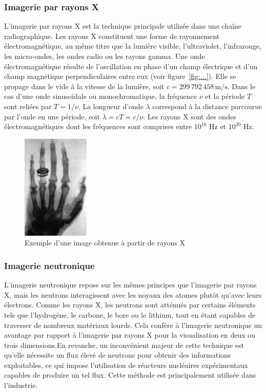 \documentclass[12pt,a4paper]{report}
\begin{document}
\subsubsection{Imagerie par rayons X}
L'imagerie par rayons X est la technique principale utilisée dans une chaîne radiographique. Les rayons X constituent une forme de rayonnement électromagnétique, au même titre que la lumière visible, l'ultraviolet, l'infrarouge, les micro-ondes, les ondes radio ou les rayons gamma.  
Une onde électromagnétique résulte de l'oscillation en phase d'un champ électrique et d'un champ magnétique perpendiculaires entre eux (voir figure~\ref{fig:...}). Elle se propage dans le vide à la vitesse de la lumière, soit \( c = 299\,792\,458 \, \text{m/s} \).  
Dans le cas d'une onde sinusoïdale ou monochromatique, la fréquence \(\nu\) et la période \(T\) sont reliées par \( T = 1/\nu \). La longueur d'onde \(\lambda\) correspond à la distance parcourue par l'onde en une période, soit \( \lambda = cT = c/\nu \).  
Les rayons X sont des ondes électromagnétiques dont les fréquences sont comprises entre \(10^{16}\) Hz et \(10^{20}\) Hz.

\begin{figure}[H]
    \centering
    \includegraphics[height=5cm]{Assets/Exemple_xray.png}
    \caption{Exemple d'une image obtenue à partir de rayons X}
    \label{fig:images}
\end{figure}

\subsubsection{Imagerie neutronique}
L'imagerie neutronique repose sur les mêmes principes que l'imagerie par rayons X, mais les neutrons interagissent avec les noyaux des atomes plutôt qu'avec leurs électrons. Comme les rayons X, les neutrons sont atténués par certains éléments tels que l'hydrogène, le carbone, le bore ou le lithium, tout en étant capables de traverser de nombreux matériaux lourds. Cela confère à l'imagerie neutronique un avantage par rapport à l'imagerie par rayons X pour la visualisation en deux ou trois dimensions.En revanche, un inconvénient majeur de cette technique est qu'elle nécessite un flux élevé de neutrons pour obtenir des informations exploitables, ce qui impose l'utilisation de réacteurs nucléaires expérimentaux capables de produire un tel flux. Cette méthode est principalement utilisée dans l'industrie.
\end{document}
